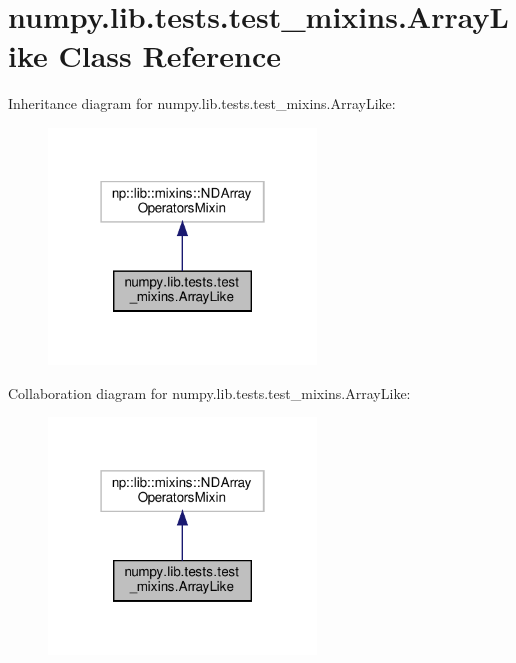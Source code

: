 \hypertarget{classnumpy_1_1lib_1_1tests_1_1test__mixins_1_1ArrayLike}{}\section{numpy.\+lib.\+tests.\+test\+\_\+mixins.\+Array\+Like Class Reference}
\label{classnumpy_1_1lib_1_1tests_1_1test__mixins_1_1ArrayLike}


Inheritance diagram for numpy.\+lib.\+tests.\+test\+\_\+mixins.\+Array\+Like\+:
\nopagebreak
\begin{figure}[H]
\begin{center}
\leavevmode
\includegraphics[width=202pt]{classnumpy_1_1lib_1_1tests_1_1test__mixins_1_1ArrayLike__inherit__graph}
\end{center}
\end{figure}


Collaboration diagram for numpy.\+lib.\+tests.\+test\+\_\+mixins.\+Array\+Like\+:
\nopagebreak
\begin{figure}[H]
\begin{center}
\leavevmode
\includegraphics[width=202pt]{classnumpy_1_1lib_1_1tests_1_1test__mixins_1_1ArrayLike__coll__graph}
\end{center}
\end{figure}
